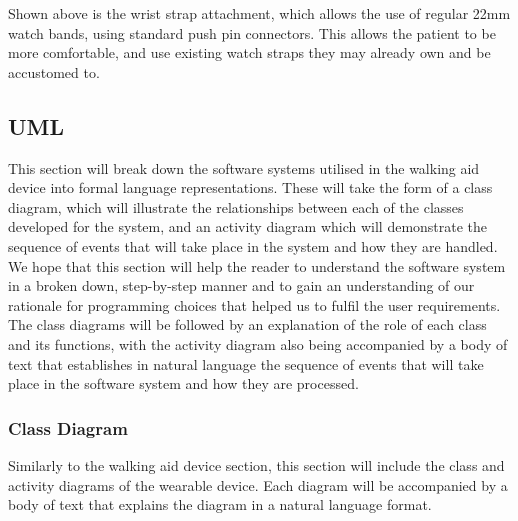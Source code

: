                     
        
                    Shown above is the wrist strap attachment, which allows the use of regular 22mm watch bands, using standard push pin connectors. This allows the patient to be more comfortable, and use existing watch straps they may already own and be accustomed to.
        
        
        
                \subsection{UML}
                \label{sec:uml_wearable}
                
                    This section will break down the software systems utilised in the walking aid device into formal language representations. These will take the form of a class diagram, which will illustrate the relationships between each of the classes developed for the system, and an activity diagram which will demonstrate the sequence of events that will take place in the system and how they are handled. We hope that this section will help the reader to understand the software system in a broken down, step-by-step manner and to gain an understanding of our rationale for programming choices that helped us to fulfil the user requirements. The class diagrams will be followed by an explanation of the role of each class and its functions, with the activity diagram also being accompanied by a body of text that establishes in natural language the sequence of events that will take place in the software system and how they are processed.
        
                    \subsubsection{Class Diagram}
                    \label{subsubsec:class_diagram_wearable}
        
                        Similarly to the walking aid device section, this section will include the class and activity diagrams of the wearable device. Each diagram will be accompanied by a body of text that explains the diagram in a natural language format.
        
                        \clearpage
                        \thispagestyle{empty}
                        \begin{landscape}
                            
                        \end{landscape}
        

